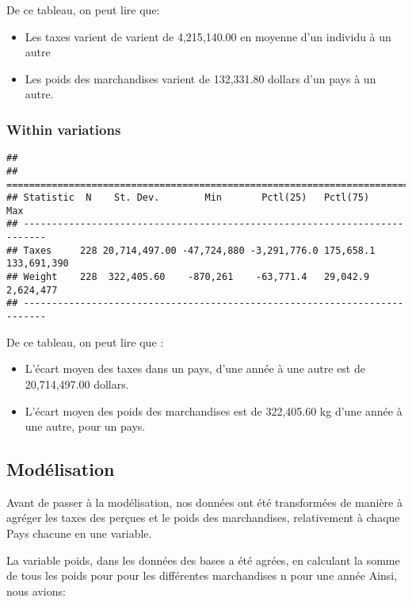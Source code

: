 \documentclass[
]{book}
\providecommand{\tightlist}{%
  \setlength{\itemsep}{0pt}\setlength{\parskip}{0pt}}
\begin{document}
De ce tableau, on peut lire que:

\begin{itemize}
\tightlist
\item
  Les taxes varient de varient de 4,215,140.00 en moyenne d'un individu à un autre
\item
  Les poids des marchandises varient de 132,331.80 dollars d'un pays à un autre.
\end{itemize}

\hypertarget{within-variations}{%
\subsubsection{Within variations}\label{within-variations}}

\begin{verbatim}
## 
## ==========================================================================
## Statistic  N    St. Dev.        Min       Pctl(25)   Pctl(75)      Max    
## --------------------------------------------------------------------------
## Taxes     228 20,714,497.00 -47,724,880 -3,291,776.0 175,658.1 133,691,390
## Weight    228  322,405.60    -870,261    -63,771.4   29,042.9   2,624,477 
## --------------------------------------------------------------------------
\end{verbatim}

De ce tableau, on peut lire que :

\begin{itemize}
\tightlist
\item
  L'écart moyen des taxes dans un pays, d'une année à une autre est de 20,714,497.00 dollars.
\item
  L'écart moyen des poids des marchandises est de 322,405.60 kg d'une année à une autre, pour un pays.
\end{itemize}

\hypertarget{moduxe9lisation}{%
\subsection{Modélisation}\label{moduxe9lisation}}

Avant de passer à la modélisation, nos données ont été transformées de manière à agréger les taxes des
perçues et le poids des marchandises, relativement à chaque Pays chacune en une variable.

La variable poids, dans les données des bases a été agrées, en calculant la somme de tous les poids pour pour les différentes marchandises n pour une année
Ainsi, nous avions:
\end{document}
